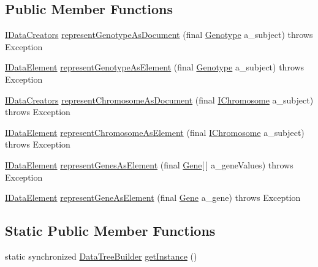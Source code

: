 \subsection*{Public Member Functions}
\begin{DoxyCompactItemize}
\item 
\hyperlink{interfaceorg_1_1jgap_1_1data_1_1_i_data_creators}{I\-Data\-Creators} \hyperlink{classorg_1_1jgap_1_1data_1_1_data_tree_builder_ac9d7f39f7bde0a12c696c401f5201600}{represent\-Genotype\-As\-Document} (final \hyperlink{classorg_1_1jgap_1_1_genotype}{Genotype} a\-\_\-subject)  throws Exception 
\item 
\hyperlink{interfaceorg_1_1jgap_1_1data_1_1_i_data_element}{I\-Data\-Element} \hyperlink{classorg_1_1jgap_1_1data_1_1_data_tree_builder_a1ffcea007c559a61a872ee14c6150888}{represent\-Genotype\-As\-Element} (final \hyperlink{classorg_1_1jgap_1_1_genotype}{Genotype} a\-\_\-subject)  throws Exception 
\item 
\hyperlink{interfaceorg_1_1jgap_1_1data_1_1_i_data_creators}{I\-Data\-Creators} \hyperlink{classorg_1_1jgap_1_1data_1_1_data_tree_builder_a4828f930beaffc5097a363320b6b9d35}{represent\-Chromosome\-As\-Document} (final \hyperlink{interfaceorg_1_1jgap_1_1_i_chromosome}{I\-Chromosome} a\-\_\-subject)  throws Exception 
\item 
\hyperlink{interfaceorg_1_1jgap_1_1data_1_1_i_data_element}{I\-Data\-Element} \hyperlink{classorg_1_1jgap_1_1data_1_1_data_tree_builder_a9dfa700d42f4e7e6c92f2c11e47ac2c5}{represent\-Chromosome\-As\-Element} (final \hyperlink{interfaceorg_1_1jgap_1_1_i_chromosome}{I\-Chromosome} a\-\_\-subject)  throws Exception 
\item 
\hyperlink{interfaceorg_1_1jgap_1_1data_1_1_i_data_element}{I\-Data\-Element} \hyperlink{classorg_1_1jgap_1_1data_1_1_data_tree_builder_af853123b9007f9122c68669554d03a0f}{represent\-Genes\-As\-Element} (final \hyperlink{interfaceorg_1_1jgap_1_1_gene}{Gene}\mbox{[}$\,$\mbox{]} a\-\_\-gene\-Values)  throws Exception 
\item 
\hyperlink{interfaceorg_1_1jgap_1_1data_1_1_i_data_element}{I\-Data\-Element} \hyperlink{classorg_1_1jgap_1_1data_1_1_data_tree_builder_ad9aa494f1ea433a65851dd001f800ec8}{represent\-Gene\-As\-Element} (final \hyperlink{interfaceorg_1_1jgap_1_1_gene}{Gene} a\-\_\-gene)  throws Exception 
\end{DoxyCompactItemize}
\subsection*{Static Public Member Functions}
\begin{DoxyCompactItemize}
\item 
static synchronized \hyperlink{classorg_1_1jgap_1_1data_1_1_data_tree_builder}{Data\-Tree\-Builder} \hyperlink{classorg_1_1jgap_1_1data_1_1_data_tree_builder_afbd669cf276392f7ce12a21b7dad9d43}{get\-Instance} ()
\end{DoxyCompactItemize}
